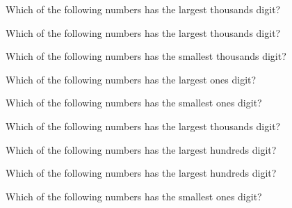 \documentclass[10pt]{exam}
\begin{document}
\begin{multicols*}{2}
\begin{questions}
\begin{oneparchoices}
\end{oneparchoices}
\question Which of the following numbers has the largest thousands digit?

\begin{oneparchoices}
\end{oneparchoices}
\question Which of the following numbers has the largest thousands digit?

\begin{oneparchoices}
\end{oneparchoices}
\question Which of the following numbers has the smallest thousands digit?

\begin{oneparchoices}
\end{oneparchoices}
\question Which of the following numbers has the largest ones digit?

\begin{oneparchoices}
\end{oneparchoices}
\question Which of the following numbers has the smallest ones digit?

\begin{oneparchoices}
\end{oneparchoices}
\question Which of the following numbers has the largest thousands digit?

\begin{oneparchoices}
\end{oneparchoices}
\question Which of the following numbers has the largest hundreds digit?

\begin{oneparchoices}
\end{oneparchoices}
\question Which of the following numbers has the largest hundreds digit?

\begin{oneparchoices}
\end{oneparchoices}
\question Which of the following numbers has the smallest ones digit?


\end{questions}
\end{multicols*}
\end{document}
